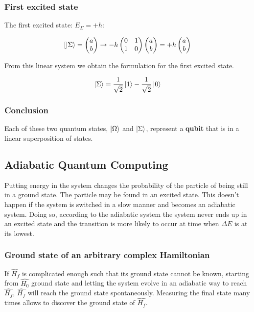 		\subsubsection{First excited state}
		The first excited state: $E_\Sigma=+h$:

		$$[\ket{\Sigma}=\begin{pmatrix}a\\b\end{pmatrix}\rightarrow-h\begin{pmatrix}0&1\\1&0\end{pmatrix}\begin{pmatrix}a\\b\end{pmatrix}=+h\begin{pmatrix}a\\b\end{pmatrix}$$

		From this linear system we obtain the formulation for the first excited state.

		$$\ket{\Sigma}=\frac{1}{\sqrt{2}}\ket{1}-\frac{1}{\sqrt{2}}\ket{0}$$

		\subsubsection{Conclusion}
		Each of these two quantum states, $\ket{\Omega}$ and $\ket{\Sigma}$, represent a \textbf{qubit} that is in a linear superposition of states.\\

\subsection{Adiabatic Quantum Computing}
Putting energy in the system changes the probability of the particle of being still in a ground state.
The particle may be found in an excited state.
This doesn't happen if the system is switched in a slow manner and becomes an adiabatic system.
Doing so, according to the adiabatic system the system never ends up in an excited state and the transition is more likely to occur at time when $\Delta E$ is at its lowest.

	\subsubsection{Ground state of an arbitrary complex Hamiltonian}
	If $\hat{H_f}$ is complicated enough such that its ground state cannot be known, starting from $\hat{H_0}$ ground state and letting the system evolve in an adiabatic way to reach $\hat{H_f}$, $\hat{H_f}$ will reach the ground state spontaneously.
	Measuring the final state many times allows to discover the ground state of $\hat{H_f}$.

